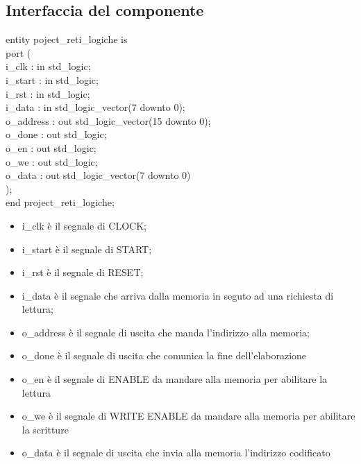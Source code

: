 \documentclass{article}
\newcommand\tab[1][1cm]{\hspace*{#1}}
\begin{document}
\subsection{Interfaccia del componente}
{\selectfont
entity poject\_reti\_logiche is\\
\tab port (\\
\tab\tab i\_clk\hspace*{1,5cm} : in std\_logic;\\
\tab\tab i\_start\hspace*{1,1cm} : in std\_logic;\\
\tab\tab i\_rst\hspace*{1,5cm} : in std\_logic;\\
\tab\tab i\_data\hspace*{1,3cm} : in std\_logic\_vector(7 downto 0);\\
\tab\tab o\_address\hspace*{0,7cm} : out std\_logic\_vector(15 downto 0);\\
\tab\tab o\_done\hspace*{1,3cm} : out std\_logic;\\
\tab\tab o\_en\hspace*{1,7cm} : out std\_logic;\\
\tab\tab o\_we\hspace*{1,7cm} : out std\_logic;\\
\tab\tab o\_data\hspace*{1,3cm} : out std\_logic\_vector(7 downto 0)\\
\tab );\\
end project\_reti\_logiche;
}
\begin{itemize}
\vspace{5mm} %
\item i\_clk è il segnale di CLOCK;
\item i\_start è il segnale di START;
\item i\_rst è il segnale di RESET;
\item i\_data è il segnale che arriva dalla memoria in seguto ad una richiesta di lettura;
\item o\_address è il segnale di uscita che manda l'indirizzo alla memoria;
\item o\_done è il segnale di uscita che comunica la fine dell'elaborazione
\item o\_en è il segnale di ENABLE da mandare alla memoria per abilitare la lettura
\item o\_we è il segnale di WRITE ENABLE da mandare alla memoria per abilitare la scritture
\item o\_data è il segnale di uscita che invia alla memoria l'indirizzo codificato
\end{itemize}
\end{document}
